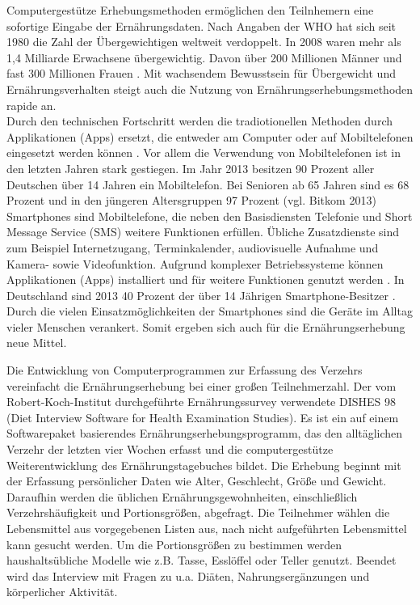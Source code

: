 Computergestütze Erhebungsmethoden ermöglichen den Teilnhemern eine sofortige Eingabe der Ernährungsdaten. Nach Angaben der WHO hat sich seit 1980 die Zahl der Übergewichtigen weltweit verdoppelt. In 2008 waren mehr als 1,4 Milliarde Erwachsene übergewichtig. Davon über 200 Millionen Männer und fast 300 Millionen Frauen \cite{whoobesityfactsheet}. Mit wachsendem Bewusstsein für Übergewicht und Ernährungsverhalten steigt auch die Nutzung von Ernährungserhebungsmethoden rapide an.\\ Durch den technischen Fortschritt werden die tradiotionellen Methoden durch Applikationen (Apps) ersetzt, die entweder am Computer oder auf Mobiltelefonen eingesetzt werden können \cite{Morikawa:2012:FRS:2390776.2390779}. Vor allem die Verwendung von Mobiltelefonen ist in den letzten Jahren stark gestiegen. Im Jahr 2013 besitzen 90 Prozent aller Deutschen über 14 Jahren ein Mobiltelefon. Bei Senioren ab 65 Jahren sind es 68 Prozent und in den jüngeren Altersgruppen 97 Prozent (vgl. Bitkom 2013) \cite{63MillionenHandy} Smartphones sind Mobiltelefone, die neben den Basisdiensten Telefonie und Short Message Service (SMS) weitere Funktionen erfüllen. Übliche Zusatzdienste sind zum Beispiel Internetzugang, Terminkalender, audiovisuelle Aufnahme und Kamera- sowie Videofunktion. Aufgrund komplexer Betriebssysteme können Applikationen (Apps) installiert und für weitere Funktionen genutzt werden \cite{Wirtschaftslexikon}. In Deutschland sind 2013 40 Prozent der über 14 Jährigen Smartphone-Besitzer \cite{63MillionenHandy}. Durch die vielen Einsatzmöglichkeiten der Smartphones sind die Geräte im Alltag vieler Menschen verankert. Somit ergeben sich auch für die Ernährungserhebung neue Mittel. 

Die Entwicklung von Computerprogrammen zur Erfassung des Verzehrs vereinfacht die Ernährungserhebung bei einer großen Teilnehmerzahl. Der vom Robert-Koch-Institut durchgeführte Ernährungssurvey verwendete DISHES 98 (Diet Interview Software for Health Examination Studies). Es ist ein auf einem Softwarepaket basierendes Ernährungserhebungsprogramm, das den alltäglichen Verzehr der letzten vier Wochen erfasst und die computergestütze Weiterentwicklung des Ernährungstagebuches bildet.  Die Erhebung beginnt mit der Erfassung persönlicher Daten wie Alter, Geschlecht, Größe und Gewicht. Daraufhin werden die üblichen Ernährungsgewohnheiten, einschließlich  Verzehrshäufigkeit und Portionsgrößen, abgefragt. Die Teilnehmer wählen die Lebensmittel aus vorgegebenen Listen aus, nach nicht aufgeführten Lebensmittel kann gesucht werden. Um die Portionsgrößen zu bestimmen werden haushaltsübliche Modelle wie z.B. Tasse, Esslöffel oder Teller genutzt. Beendet wird das Interview mit Fragen zu u.a. Diäten, Nahrungsergänzungen und körperlicher Aktivität. \cite{validityofDISHES98}

